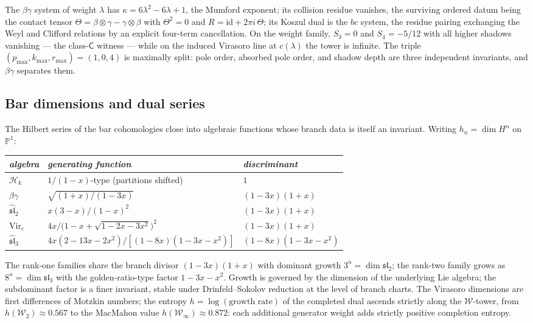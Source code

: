 \documentclass[11pt]{amsart}
\numberwithin{equation}{section}
\theoremstyle{plain}
\theoremstyle{definition}
\theoremstyle{remark}
\newcommand{\cW}{\mathcal{W}}
\newcommand{\Vir}{\mathrm{Vir}}
\begin{document}
The $\beta\gamma$ system of weight $\lambda$ has
$\kappa=6\lambda^{2}-6\lambda+1$, the Mumford exponent; its collision
residue vanishes, the surviving ordered datum being the contact tensor
$\Theta=\beta\otimes\gamma-\gamma\otimes\beta$ with
$\Theta^{2}=0$ and $R=\mathrm{id}+2\pi i\,\Theta$; its Koszul dual is
the $bc$ system, the residue pairing exchanging the Weyl and Clifford
relations by an explicit four-term cancellation. On the weight family,
$S_3=0$ and $S_4=-5/12$ with all higher shadows vanishing --- the
class-$\mathsf{C}$ witness --- while on the induced Virasoro line at
$c(\lambda)$ the tower is infinite. The triple
$(p_{\max},k_{\max},r_{\max})=(1,0,4)$ is maximally split: pole order,
absorbed pole order, and shadow depth are three independent invariants,
and $\beta\gamma$ separates them.

\subsection{Bar dimensions and dual series}

The Hilbert series of the bar cohomologies close into algebraic
functions whose branch data is itself an invariant. Writing $h_n=\dim
H^{n}$ on $\mathbb{P}^{1}$:
\begin{center}
\begin{tabular}{lll}
\emph{algebra} & \emph{generating function} & \emph{discriminant}\\
\hline
$\mathcal{H}_k$ & $1/(1-x)$-type (partitions shifted) & $1$\\
$\beta\gamma$ & $\sqrt{(1+x)/(1-3x)}$ & $(1-3x)(1+x)$\\
$\widehat{\mathfrak{sl}}_2$ & $x(3-x)/(1-x)^{2}$ & $(1-3x)(1+x)$\\
$\Vir_c$ & $4x/\bigl(1-x+\sqrt{1-2x-3x^{2}}\bigr)^{2}$ & $(1-3x)(1+x)$\\
$\widehat{\mathfrak{sl}}_3$ & $4x(2-13x-2x^{2})/[(1-8x)(1-3x-x^{2})]$ &
$(1-8x)(1-3x-x^{2})$
\end{tabular}
\end{center}
The rank-one families share the branch divisor $(1-3x)(1+x)$ with
dominant growth $3^{n}=\dim\mathfrak{sl}_2$; the rank-two family grows
as $8^{n}=\dim\mathfrak{sl}_3$ with the golden-ratio-type factor
$1-3x-x^{2}$. Growth is governed by the dimension of the underlying Lie
algebra; the subdominant factor is a finer invariant, stable under
Drinfeld--Sokolov reduction at the level of branch charts. The Virasoro
dimensions are first differences of Motzkin numbers; the entropy
$h=\log(\text{growth rate})$ of the completed dual ascends strictly
along the $\cW$-tower, from $h(\cW_2)\approx0.567$ to the MacMahon value
$h(\cW_\infty)\approx0.872$: each additional generator weight adds
strictly positive completion entropy.
\end{document}
